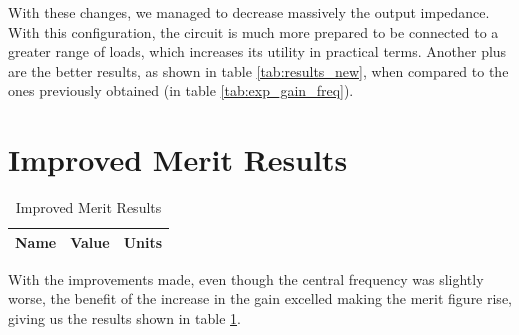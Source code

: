 With these changes, we managed to decrease massively the output impedance. With this configuration, the circuit is much more prepared to be connected to a greater range of loads, which increases its utility in practical terms. Another plus are the better results, as shown in table \ref{tab:results_new}, when compared to the ones previously obtained (in table \ref{tab:exp_gain_freq}).

\pagebreak

\section{Improved Merit Results}
\label{sec:merit_new}

\begin{table}[h]
    \centering
    \begin{tabular}{|l|c|c|}
    \hline
    {\bf Name} & {\bf Value} & {Units}\\ \hline
    
    \end{tabular}
    \caption{Improved Merit Results}
    \label{tab:merit_new}
\end{table}

With the improvements made, even though the central frequency was slightly worse, the benefit of the increase in the gain excelled making the merit figure rise, giving us the results shown in table \ref{tab:merit_new}.



